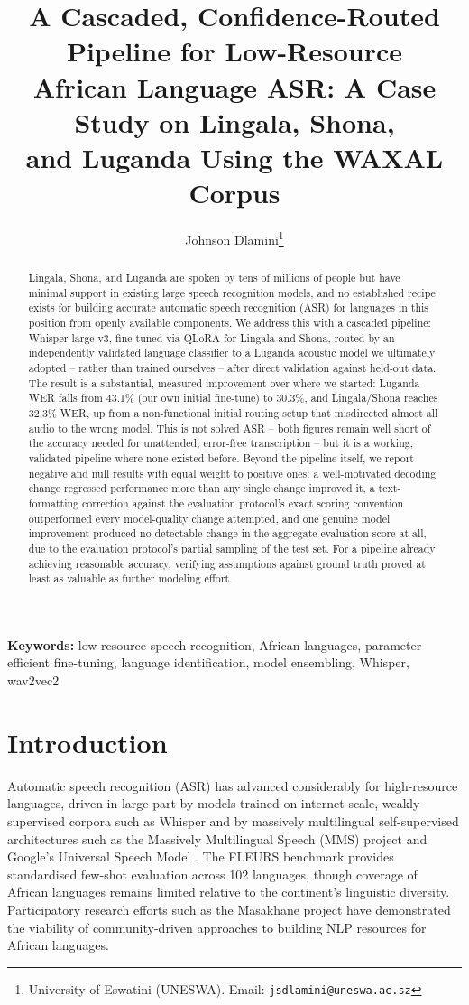 \documentclass[11pt]{article}
\title{A Cascaded, Confidence-Routed Pipeline for Low-Resource\\
African Language ASR: A Case Study on Lingala, Shona,\\
and Luganda Using the WAXAL Corpus}
\author{Johnson Dlamini\thanks{University of Eswatini (UNESWA). Email: \texttt{jsdlamini@uneswa.ac.sz}}}
\date{}
\begin{document}
\maketitle

\begin{abstract}
Lingala, Shona, and Luganda are spoken by tens of millions of people but have minimal support in existing large speech recognition models, and no established recipe exists for building accurate automatic speech recognition (ASR) for languages in this position from openly available components. We address this with a cascaded pipeline: Whisper large-v3, fine-tuned via QLoRA for Lingala and Shona, routed by an independently validated language classifier to a Luganda acoustic model we ultimately adopted -- rather than trained ourselves -- after direct validation against held-out data. The result is a substantial, measured improvement over where we started: Luganda WER falls from 43.1\% (our own initial fine-tune) to 30.3\%, and Lingala/Shona reaches 32.3\% WER, up from a non-functional initial routing setup that misdirected almost all audio to the wrong model. This is not solved ASR -- both figures remain well short of the accuracy needed for unattended, error-free transcription -- but it is a working, validated pipeline where none existed before. Beyond the pipeline itself, we report negative and null results with equal weight to positive ones: a well-motivated decoding change regressed performance more than any single change improved it, a text-formatting correction against the evaluation protocol's exact scoring convention outperformed every model-quality change attempted, and one genuine model improvement produced no detectable change in the aggregate evaluation score at all, due to the evaluation protocol's partial sampling of the test set. For a pipeline already achieving reasonable accuracy, verifying assumptions against ground truth proved at least as valuable as further modeling effort.
\end{abstract}

\noindent\textbf{Keywords:} low-resource speech recognition, African languages, parameter-efficient fine-tuning, language identification, model ensembling, Whisper, wav2vec2

\section{Introduction}

Automatic speech recognition (ASR) has advanced considerably for high-resource languages, driven in large part by models trained on internet-scale, weakly supervised corpora such as Whisper \cite{radford2023whisper} and by massively multilingual self-supervised architectures such as the Massively Multilingual Speech (MMS) project \cite{pratap2024mms} and Google's Universal Speech Model \cite{zhang2023usm}. The FLEURS benchmark \cite{conneau2023fleurs} provides standardised few-shot evaluation across 102 languages, though coverage of African languages remains limited relative to the continent's linguistic diversity. Participatory research efforts such as the Masakhane project \cite{nekoto2020masakhane} have demonstrated the viability of community-driven approaches to building NLP resources for African languages.
\end{document}
